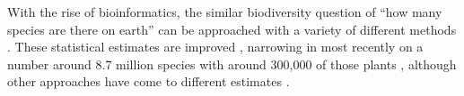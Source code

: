 \documentclass[12pt]{article}
\begin{document}
With the rise of bioinformatics, the similar biodiversity question of
``how many species are there on earth'' can be approached with a variety of different methods
\citep{may1988many,erwin1991many, stork1993many, joppa2010,
  costello2011, mora2011plos}.  These statistical estimates are
improved , narrowing in most recently on a number around 8.7 million
species with around 300,000 of those plants \citep{mora2011plos}, although other approaches have come to different estimates \citep{costello2011}.
% 
%
%
% 
% 
\end{document}
